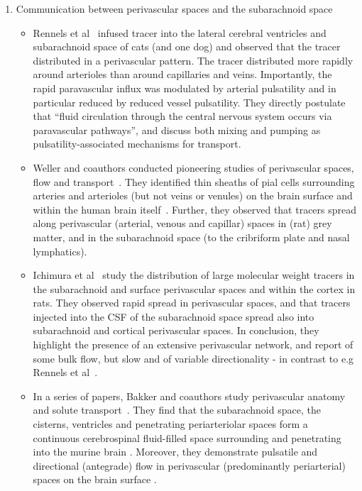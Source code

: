 \documentclass[fleqn,10pt]{wlscirep}
\begin{document}
\begin{enumerate}
\item
  Communication between perivascular spaces and the subarachnoid space
  \begin{itemize}
  \item
    Rennels et al~\cite{rennels1985evidence} infused tracer into the lateral cerebral ventricles and subarachnoid space of cats (and one dog) and observed that the tracer distributed in a perivascular pattern. The tracer distributed more rapidly around arterioles than around capillaries and veins. Importantly, the rapid paravascular influx was modulated by arterial pulsatility and in particular reduced by reduced vessel pulsatility. They directly postulate that ``fluid circulation through the central nervous system occurs via paravascular pathways'', and discuss both mixing and pumping as pulsatility-associated mechanisms for transport. 
  \item
    Weller and coauthors conducted pioneering studies of perivascular spaces, flow and transport~\cite{zhang1990interrelationships, zhang1992directional, weller2005microscopic}. They identified thin sheaths of pial cells surrounding arteries and arterioles (but not veins or venules) on the brain surface and within the human brain itself~\cite{zhang1990interrelationships}. Further, they observed that tracers spread along perivascular (arterial, venous and capillar) spaces in (rat) grey matter, and in the subarachnoid space (to the cribriform plate and nasal lymphatics).   
  \item
    Ichimura et al~\cite{ichimura1991distribution} study the distribution of large molecular weight tracers in the subarachnoid and surface perivascular spaces and within the cortex in rats. They observed rapid spread in perivascular spaces, and that tracers injected into the CSF of the subarachnoid space spread also into subarachnoid and cortical perivascular spaces. In conclusion, they highlight the presence of an extensive perivascular network, and report of some bulk flow, but slow and of variable directionality - in contrast to e.g Rennels et al~\cite{rennels1985evidence}. 
  \item In a series of papers, Bakker and coauthors study perivascular anatomy and solute transport~\cite{bedussi2017paravascular, bedussi2018paravascular}. They find that the subarachnoid space, the cisterns, ventricles and penetrating periarteriolar spaces form a continuous cerebrospinal fluid-filled space surrounding and penetrating into the murine brain \cite{bedussi2017paravascular}. Moreover, they demonstrate pulsatile and directional (antegrade) flow in perivascular (predominantly periarterial) spaces on the brain surface \cite{bedussi2018paravascular}. 

\end{itemize}
\end{enumerate}
\end{document}
